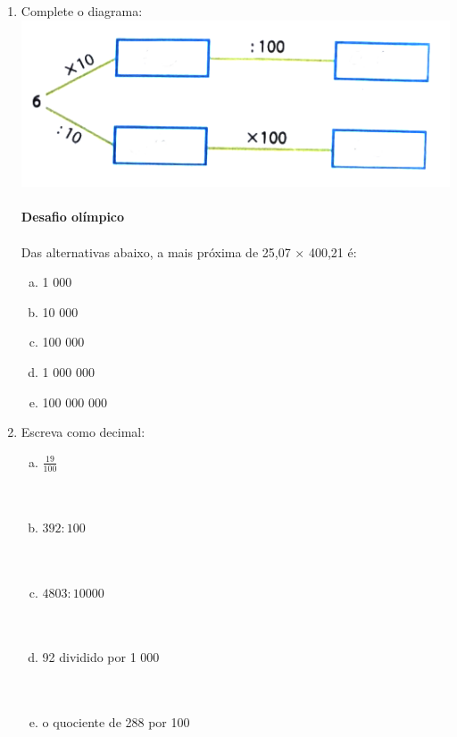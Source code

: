 \documentclass[a4paper,14pt]{article}
\begin{document}
\begin{multicols}{2}
\begin{enumerate}
    			\item Complete o diagrama: \\
    			\includegraphics[width=1.1\linewidth]{6FMA58_imagens/imagem1} \\\\
    			\textbf{Desafio olímpico} \\\\
    			Das alternativas abaixo, a mais próxima de 25,07 $\times$ 400,21 é: \\
    			\begin{enumerate}[a)]
    				\item 1 000
    				\item 10 000
    				\item 100 000
    				\item 1 000 000
    				\item 100 000 000
    			\end{enumerate}
    			\item Escreva como decimal:
    			\begin{enumerate}[a)]
    				\item $\frac{19}{100}$ \\\\\\
    				\item $392 : 100$ \\\\\\
    				\item $4 803 : 10 000$ \\\\\\
    				\item 92 dividido por 1 000 \\\\\\
    				\item o quociente de 288 por 100 \\\\\\

\end{enumerate}
\end{enumerate}
\end{multicols}
\end{document}
